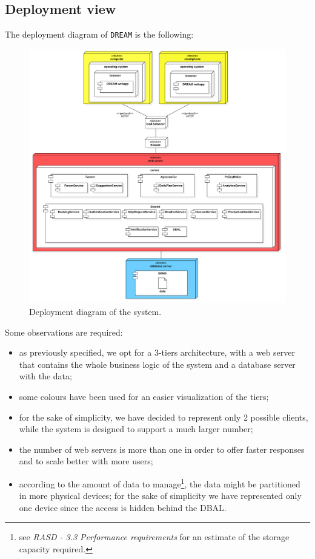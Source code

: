 \documentclass{article}
\begin{document}
\subsection{Deployment view}
The deployment diagram of \verb|DREAM| is the following:
\begin{figure}[H]
    \centering
    \includegraphics[scale=0.43]{diagrams/deployment_diagram.png}
    \caption{Deployment diagram of the system.}
    \label{fig:deployment_diagram}
\end{figure}
\newpage
Some observations are required:
\begin{itemize}
    \item as previously specified, we opt for a 3-tiers architecture, with a web server that contains the whole business logic of the system and a database server with the data;
    \item some colours have been used for an easier visualization of the tiers;
    \item for the sake of simplicity, we have decided to represent only 2 possible clients, while the system is designed to support a much larger number;
    \item the number of web servers is more than one in order to offer faster responses and to scale better with more users;
    \item according to the amount of data to manage\footnote{see \textit{RASD - 3.3 Performance requirements} for an estimate of the storage capacity required.}, the data might be partitioned in more physical devices; for the sake of simplicity we have represented only one device since the access is hidden behind the DBAL.
\end{itemize}
\end{document}
